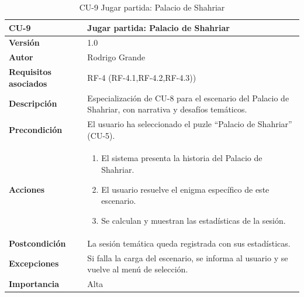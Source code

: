\begin{table}[p]
	\centering
	\begin{tabularx}{\linewidth}{ p{} p{} }
		\toprule
		\textbf{CU-9} & \textbf{Jugar partida: Palacio de Shahriar}\\
		\toprule
		\textbf{Versión}              & 1.0    \\
		\textbf{Autor}                & Rodrigo Grande \\
		\textbf{Requisitos asociados} & RF-4 (RF-4.1,RF-4.2,RF-4.3)) \\
		\textbf{Descripción}          & Especialización de CU-8 para el escenario del Palacio de Shahriar, con narrativa y desafíos temáticos.\\
		\textbf{Precondición}         & El usuario ha seleccionado el puzle “Palacio de Shahriar” (CU-5). \\
		\textbf{Acciones}             &
		\begin{enumerate}
			\def\labelenumi{\arabic{enumi}.}
			\tightlist
			\item El sistema presenta la historia del Palacio de Shahriar.
			\item El usuario resuelve el enigma específico de este escenario.
			\item Se calculan y muestran las estadísticas de la sesión.
		\end{enumerate}\\
		\textbf{Postcondición}        & La sesión temática queda registrada con sus estadísticas. \\
		\textbf{Excepciones}          & Si falla la carga del escenario, se informa al usuario y se vuelve al menú de selección. \\
		\textbf{Importancia}          & Alta \\
		\bottomrule
	\end{tabularx}
	\caption{CU-9 Jugar partida: Palacio de Shahriar }
	\label{cu:jugar-partida-palacio-shahriar}
    \end{table}
